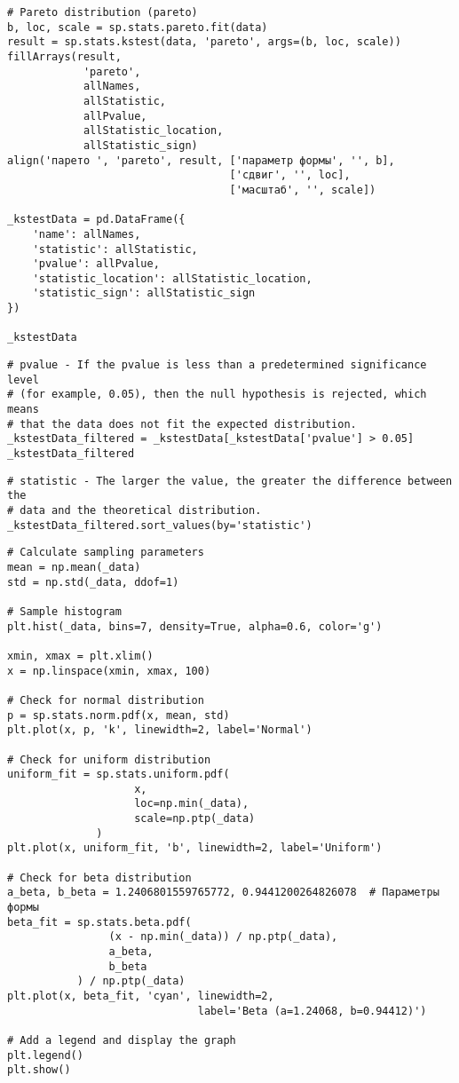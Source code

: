 \documentclass[a4paper, 14pt]{extarticle}
\begin{document}
\begin{lstlisting}
# Pareto distribution (pareto)
b, loc, scale = sp.stats.pareto.fit(data)
result = sp.stats.kstest(data, 'pareto', args=(b, loc, scale))
fillArrays(result, 
            'pareto', 
            allNames, 
            allStatistic, 
            allPvalue, 
            allStatistic_location, 
            allStatistic_sign)
align('парето ', 'pareto', result, ['параметр формы', '', b], 
                                   ['сдвиг', '', loc],
                                   ['масштаб', '', scale])

_kstestData = pd.DataFrame({
    'name': allNames,
    'statistic': allStatistic,
    'pvalue': allPvalue,
    'statistic_location': allStatistic_location,
    'statistic_sign': allStatistic_sign
})

_kstestData
\end{lstlisting}

\begin{lstlisting}
# pvalue - If the pvalue is less than a predetermined significance level 
# (for example, 0.05), then the null hypothesis is rejected, which means 
# that the data does not fit the expected distribution.
_kstestData_filtered = _kstestData[_kstestData['pvalue'] > 0.05]
_kstestData_filtered
\end{lstlisting}

\begin{lstlisting}
# statistic - The larger the value, the greater the difference between the 
# data and the theoretical distribution.
_kstestData_filtered.sort_values(by='statistic')
\end{lstlisting}

\begin{lstlisting}
# Calculate sampling parameters
mean = np.mean(_data)
std = np.std(_data, ddof=1)

# Sample histogram
plt.hist(_data, bins=7, density=True, alpha=0.6, color='g')

xmin, xmax = plt.xlim()
x = np.linspace(xmin, xmax, 100)

# Check for normal distribution
p = sp.stats.norm.pdf(x, mean, std)
plt.plot(x, p, 'k', linewidth=2, label='Normal')

# Check for uniform distribution
uniform_fit = sp.stats.uniform.pdf(
                    x, 
                    loc=np.min(_data), 
                    scale=np.ptp(_data)
              )
plt.plot(x, uniform_fit, 'b', linewidth=2, label='Uniform')

# Check for beta distribution
a_beta, b_beta = 1.2406801559765772, 0.9441200264826078  # Параметры формы
beta_fit = sp.stats.beta.pdf(
                (x - np.min(_data)) / np.ptp(_data), 
                a_beta, 
                b_beta
           ) / np.ptp(_data)
plt.plot(x, beta_fit, 'cyan', linewidth=2, 
                              label='Beta (a=1.24068, b=0.94412)')

# Add a legend and display the graph
plt.legend()
plt.show()
\end{lstlisting}
\end{document}
